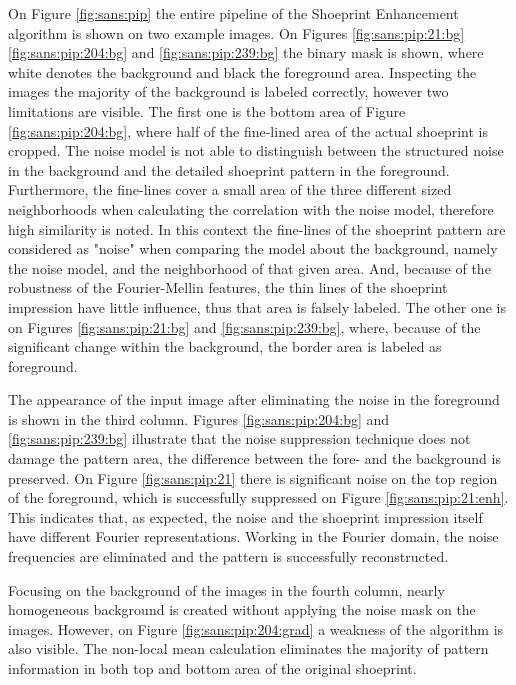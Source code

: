 \documentclass[draft,final]{vutinfth} %
\begin{document}
\par
On Figure \ref{fig:sans:pip} the entire pipeline of the Shoeprint Enhancement algorithm is shown on two example images.
On Figures  \ref{fig:sans:pip:21:bg} \ref{fig:sans:pip:204:bg} and \ref{fig:sans:pip:239:bg} the binary mask is shown, where white denotes the background and black the foreground area.
Inspecting the images the majority of the background is labeled correctly, however two limitations are visible.
The first one is the bottom area of Figure \ref{fig:sans:pip:204:bg}, where half of the fine-lined area of the actual shoeprint is cropped.
The noise model is not able to distinguish between the structured noise in the background and the detailed shoeprint pattern in the foreground.
Furthermore, the fine-lines cover a small area of the three different sized neighborhoods when calculating the correlation with the noise model, therefore high similarity is noted.
In this context the fine-lines of the shoeprint pattern are considered as "noise" when comparing the model about the background, namely the noise model, and the neighborhood of that given area.
And, because of the robustness of the Fourier-Mellin features, the thin lines of the shoeprint impression have little influence, thus that area is falsely labeled.
The other one is on Figures \ref{fig:sans:pip:21:bg} and \ref{fig:sans:pip:239:bg}, where, because of the significant change within the background, the border area is labeled as foreground.
\par
The appearance of the input image after eliminating the noise in the foreground is shown in the third column.
Figures  \ref{fig:sans:pip:204:bg} and \ref{fig:sans:pip:239:bg} illustrate that the noise suppression technique does not damage the pattern area, the difference between the fore- and the background is preserved.
On Figure \ref{fig:sans:pip:21} there is significant noise on the top region of the foreground, which is successfully suppressed on Figure \ref{fig:sans:pip:21:enh}.
This indicates that, as expected, the noise and the shoeprint impression itself have different Fourier representations.
Working in the Fourier domain, the noise frequencies are eliminated and the pattern is successfully reconstructed.
\par
Focusing on the background of the images in the fourth column, nearly homogeneous background is created without applying the noise mask on the images.
However, on Figure \ref{fig:sans:pip:204:grad} a weakness of the algorithm is also visible.
The non-local mean calculation eliminates the majority of pattern information in both top and bottom area of the original shoeprint.
\end{document}

